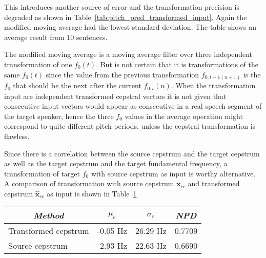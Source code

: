This introduces another source of error and the transformation precision is degraded as shown in Table~\ref{tab:pitch_pred_transformed_input}. Again the modified moving average had the lowest standard deviation. The table shows an average result from 10 sentences.

The modified moving average is a moving average filter over three independent transformation of one $f_0(t)$. But is not certain that it is transformations of the same $f_0(t)$ since the value from the previous transformation $f_{0,t-1(n+1)}$ is the $f_0$ that should be the next after the current $f_{0,t}(n)$. When the transformation input are independent transformed cepstral vectors it is not given that consecutive input vectors would appear as consecutive in a real speech segment of the target speaker, hence the three $f_0$ values in the average operation might correspond to quite different pitch periods, unless the cepstral transformation is flawless.

Since there is a correlation between the source cepstrum and the target cepstrum as well as the target cepstrum and the target fundamental frequency, a transformation of target $f_0$ with source cepstrum as input is worthy alternative. A comparison of transformation with source cepstrum $\mathbf{x}_{cc}$ and transformed cepstrum $\mathbf{\hat{x}}_{cc}$ as input is shown in Table~\ref{tab:f0_source_transform}
\begin{table}[htbp]
	\begin{center}
		\label{tab:f0_source_transform}
		\begin{tabular}{lrrr}
			\toprule
			\multicolumn{1}{c}{\emph{Method}} & \multicolumn{1}{c}{\emph{$\mu_e$}} & \multicolumn{1}{c}{\emph{$\sigma_e$}} & \multicolumn{1}{c}{\emph{NPD}}\\
			\midrule
			Transformed cepstrum & -0.05 Hz & 26.29 Hz & 0.7709\\
			Source cepstrum & -2.93 Hz & 22.63 Hz & 0.6690\\
			\bottomrule			
		\end{tabular}		
	\end{center}	
\end{table}

